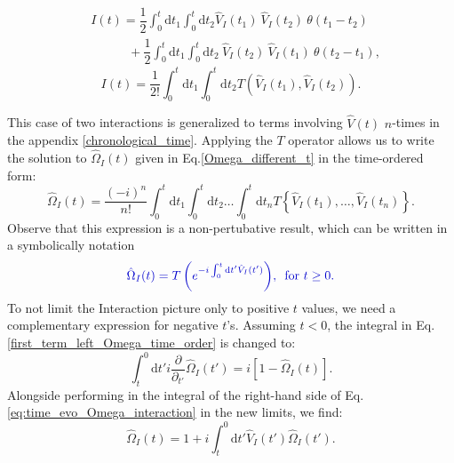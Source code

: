 \documentclass[12pt, titlepage]{article}
\begin{document}
\begin{equation*}
\begin{split}
&I(t)=\dfrac{1}{2}
\int_{0}^{t}\mathrm{d}t_1\int_{0}^{t}\! \! \mathrm{d}t_2
\hat{V}_{I}(t_1)\ \hat{V}_{I}(t_2)\ \theta (t_1 -t_2)
\\
&\quad\qquad
+
\dfrac{1}{2}
\int_{0}^{t}\mathrm{d}t_1\int_{0}^{t}\! \! \mathrm{d}t_2
\ \hat{V}_{I}(t_2)\  \hat{V}_{I}(t_1) \ \theta (t_2-t_1)
,
\end{split}
\end{equation*}
\begin{equation}
I(t)=\dfrac{1}{2!}
\int_{0}^{t}\mathrm{d}t_1\int_{0}^{t}\! \! \mathrm{d}t_2
T(\hat{V}_{I}(t_1),\hat{V}_{I}(t_2))
.
\end{equation}

This case of two interactions is generalized to terms involving $\hat{V}(t) $ $ n $-times in the appendix \ref{chronological_time}.  
Applying the $ T $ operator allows us to write the solution to $ \hat{\Omega}_{I}(t) $ given in Eq.\enskip\eqref{Omega_different_t} in the time-ordered form:
\begin{equation}\label{Omega_I_long_timeorderd}
\hat{\Omega}_{I}(t)
=
\frac{(-i)^{n}}{n!}
\int_{0}^{t}\mathrm{d}t_1\int_{0}^{t}\! \! \mathrm{d}t_2
 \ldots
 \int_{0}^{t}\! \! \mathrm{d}t_n
 T\left\lbrace \hat{V}_{I}(t_1), \ldots , \hat{V}_{I}(t_n)\right\rbrace 
 .
\end{equation}
Observe that this expression is a non-pertubative result, which can  be written in a symbolically notation
\begin{equation}\label{eq:Omega_I_Chron_0}
\textcolor[RGB]{0,0,204}{
\hat{\Omega}_{I}(t)
=T\left( e^{-i\int_{0}^{t}\mathrm{d}t^{\prime} \hat{V}_{I}(t^{\prime})} \right)
	\! ,\text{\enskip for  }  t\geq 0 
	.}
\end{equation}
To not limit the Interaction picture only to positive $ t $ values, we need a complementary expression for negative $ t $'s. Assuming $ t<0 $, the integral in Eq.\enskip\eqref{first_term_left_Omega_time_order} is changed to:
 \begin{equation}\label{first_term_left_anti_chrono}
 \int_{t}^{0}\mathrm{d}t'
 i
 \frac{\partial}{\partial_{t'}} 
 \hat{\Omega}_{I} (t')
 =
 i
 \left[ 
1 -\hat{\Omega}_{I}(t)
 \right] .
 \end{equation}
 Alongside performing in the integral of the right-hand side of  Eq.\enskip\eqref{eq:time_evo_Omega_interaction} in the new limits, we find:
 \begin{equation}
  \hat{\Omega}_{I}(t)=
1
+
i
\int^{0}_{t}\mathrm{d}t'\hat{V}_{I}(t')\hat{\Omega}_{I}(t')	.
  \end{equation} 
\end{document}
